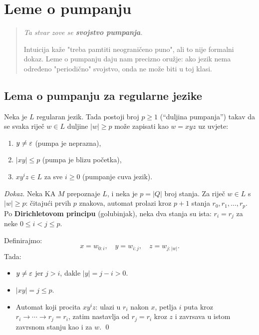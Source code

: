 \chapter{Leme o pumpanju}
\label{chap:6}

\begin{quote}
\itshape
Ta stvar zove se \textbf{svojstvo pumpanja}.

Intuicija kaže "treba pamtiti neograničeno puno", ali to nije formalni dokaz.
Leme o pumpanju daju nam precizno oružje: ako jezik nema određeno
"periodično" svojstvo, onda ne može biti u toj klasi.
\end{quote}

\section{Lema o pumpanju za regularne jezike}

\begin{propozicija}
Neka je $L$ regularan jezik. Tada postoji broj $p \geq 1$
(``duljina pumpanja'') takav da se svaka riječ $w \in L$ duljine
$|w| \geq p$ može zapisati kao $w = xyz$ uz uvjete:
\begin{enumerate}[label=(\roman*)]
  \item $y \neq \varepsilon$ \quad (pumpa je neprazna),
  \item $|xy| \leq p$ \quad (pumpa je blizu početka),
  \item $xy^i z \in L$ za sve $i \geq 0$ \quad (pumpanje cuva jezik).
\end{enumerate}
\end{propozicija}

\textit{Dokaz.}
Neka KA $M$ prepoznaje $L$, i neka je $p = |Q|$ broj stanja.
Za riječ $w \in L$ s $|w| \geq p$: čitajući prvih $p$ znakova,
automat prolazi kroz $p+1$ stanja $r_0, r_1, \ldots, r_p$.
Po \textbf{Dirichletovom principu} (golubinjak), neka dva stanja
su ista: $r_i = r_j$ za neke $0 \leq i < j \leq p$.

Definirajmo:
\[
  x = w_{0:i}, \quad y = w_{i:j}, \quad z = w_{j:|w|}.
\]
Tada:
\begin{itemize}
  \item $y \neq \varepsilon$ jer $j > i$, dakle $|y| = j - i > 0$.
  \item $|xy| = j \leq p$.
  \item Automat koji procita $xy^i z$: ulazi u $r_i$ nakon $x$,
        petlja $i$ puta kroz $r_i \to \cdots \to r_j = r_i$,
        zatim nastavlja od $r_j = r_i$ kroz $z$ i zavrsava u istom
        zavrsnom stanju kao i za $w$. \qed
\end{itemize}

